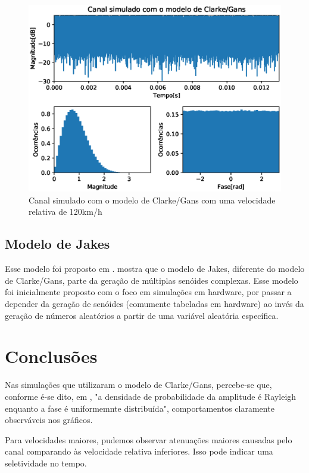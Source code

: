 \documentclass[journal,11pt,twocolumn]{IEEEtran}
\begin{document}
\begin{figure}[h!]
    \centering
    \includegraphics[scale=0.55]{gans_120kmh.eps}
    \caption{Canal simulado com o modelo de Clarke/Gans com uma velocidade relativa de 120km/h}
    \label{fig:gans-120km-h}
\end{figure}
\subsection{Modelo de Jakes}
Esse modelo foi proposto em \cite{jakes}. \cite{mimo} mostra que o modelo de Jakes, diferente do modelo de Clarke/Gans, parte da geração de múltiplas senóides complexas. Esse modelo foi inicialmente proposto com o foco em simulações em hardware, por passar a depender da geração de senóides (comumente tabeladas em hardware) ao invés da geração de números aleatórios a partir de uma variável aleatória específica.

\section{Conclusões}

Nas simulações que utilizaram o modelo de Clarke/Gans, percebe-se que, conforme é-se dito, em \cite{gans}, "a densidade de probabilidade da amplitude é Rayleigh enquanto a fase é uniformemnte distribuída", comportamentos claramente observáveis nos gráficos.

Para velocidades maiores, pudemos observar atenuações maiores causadas pelo canal comparando às velocidade relativa inferiores. Isso pode indicar  uma seletividade no tempo.
\end{document}
